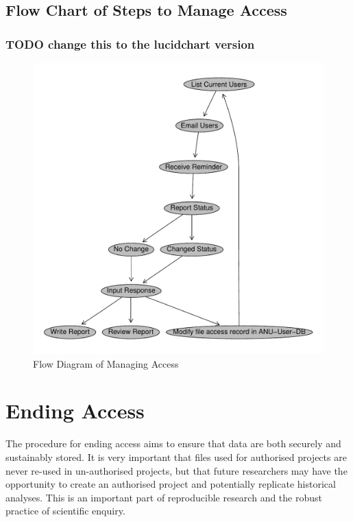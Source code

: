 \documentclass[a4paper]{article}
\begin{document}
\subsection{Flow Chart of Steps to Manage Access}
\label{sec-3-1}
\subsubsection{\textbf{TODO} change this to the lucidchart version}
\label{sec-3-1-1}

\begin{figure}[!h]
\centering
\includegraphics[width=\textwidth]{DataAccessFlowDiagram-ManagingAccess.pdf}
\caption{Flow Diagram of Managing Access}
\label{fig:DataAccessFlowDiagram-ManagingAccess}
\end{figure}
\clearpage
\section{Ending Access}
\label{sec-4}

The procedure for ending access aims to ensure that data are both securely and sustainably stored.  It is very important that files used for authorised projects are never re-used in un-authorised projects, but that future researchers may have the opportunity to create an authorised project and potentially replicate historical analyses.  This is an important part of reproducible research and the robust practice of scientific enquiry.
\end{document}
